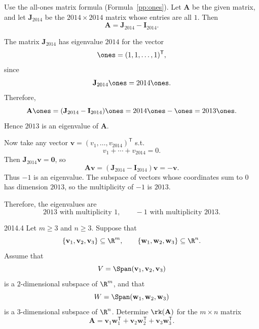     \begin{solution}
        Use the all-ones matrix formula (Formula~\ref{pp:ones}). Let $\mathbf{A}$ be the given matrix, and let $\mathbf{J}_{2014}$ be the $2014\times 2014$ matrix
        whose entries are all $1$. Then
        \[
            \mathbf{A}=\mathbf{J}_{2014}-\mathbf{I}_{2014}.
        \]

        The matrix $\mathbf{J}_{2014}$ has eigenvalue $2014$ for the vector
        \[
            \ones=(1,1,\dots,1)^{\mathsf T},
        \]
        since
        \[
            \mathbf{J}_{2014}\ones=2014\ones.
        \]
        Therefore,
        \[
            \mathbf{A}\ones
            =
            (\mathbf{J}_{2014}-\mathbf{I}_{2014})\ones
            =
            2014\ones-\ones
            =
            2013\ones.
        \]
        Hence $2013$ is an eigenvalue of $\mathbf{A}$.

        Now take any vector $\mathbf{v}=(v_1,\dots,v_{2014})^{\mathsf T}$ s.t.
        \[
            v_1+\cdots+v_{2014}=0.
        \]
        Then $\mathbf{J}_{2014}\mathbf{v}=\mathbf{0}$, so
        \[
            \mathbf{A}\mathbf{v}
            =
            (\mathbf{J}_{2014}-\mathbf{I}_{2014})\mathbf{v}
            =
            -\mathbf{v}.
        \]
        Thus $-1$ is an eigenvalue. The subspace of vectors whose coordinates sum to $0$ has
        dimension $2013$, so the multiplicity of $-1$ is $2013$.

        Therefore, the eigenvalues are
        \[
            \boxed{2013 \text{ with multiplicity } 1,\qquad -1 \text{ with multiplicity } 2013}.
        \]
    \end{solution}

    \begin{pastproblem}{2014.4}
        Let $m\geq 3$ and $n\geq 3$. Suppose that
        \[
            \{\mathbf{v}_1,\mathbf{v}_2,\mathbf{v}_3\}\subseteq \R^m,
            \qquad
            \{\mathbf{w}_1,\mathbf{w}_2,\mathbf{w}_3\}\subseteq \R^n.
        \]
        Assume that
        \[
            V=\Span(\mathbf{v}_1,\mathbf{v}_2,\mathbf{v}_3)
        \]
        is a $2$-dimensional subspace of $\R^m$, and that
        \[
            W=\Span(\mathbf{w}_1,\mathbf{w}_2,\mathbf{w}_3)
        \]
        is a $3$-dimensional subspace of $\R^n$. Determine $\rk(\mathbf{A})$ for the $m\times n$
        matrix
        \[
            \mathbf{A}
            =
            \mathbf{v}_1\mathbf{w}_1^{\mathsf T}
            +
            \mathbf{v}_2\mathbf{w}_2^{\mathsf T}
            +
            \mathbf{v}_3\mathbf{w}_3^{\mathsf T}.
        \]
    \end{pastproblem}


